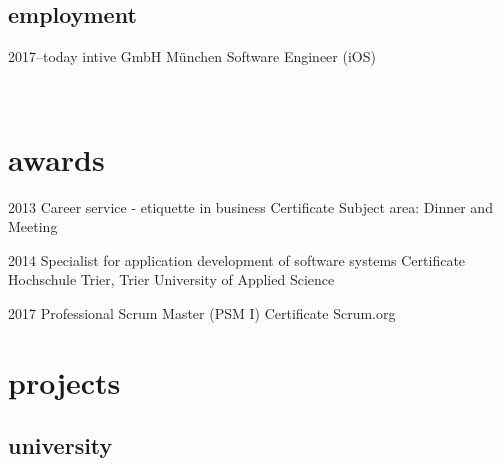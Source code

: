\documentclass[]{friggeri-cv} %
\begin{document}
\subsection{employment}

\begin{entrylist}
	
	\entry
	{2017--today}
	{intive GmbH}
	{M\"{u}nchen}
	{Software Engineer (iOS)}
	
	\\ 
\end{entrylist}

\newpage

\section{awards}

\begin{entrylist}


\entry
{2013}
{Career service - etiquette in business}
{Certificate}
{Subject area: Dinner and Meeting}


\entry
{2014}
{Specialist for application development of software systems}
{Certificate}
{Hochschule Trier, Trier University of Applied Science}

\entry
{2017}
{Professional Scrum Master (PSM I)}
{Certificate}
{Scrum.org}
\\ 
\end{entrylist}


\section{projects}

\subsection{university}
\end{document}
